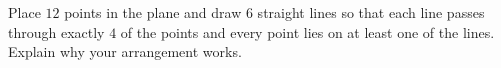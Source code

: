 Place $12$ points in the plane and draw $6$ straight lines so that each line passes through exactly $4$ of the points and every point lies on at least one of the lines. Explain why your arrangement works.
